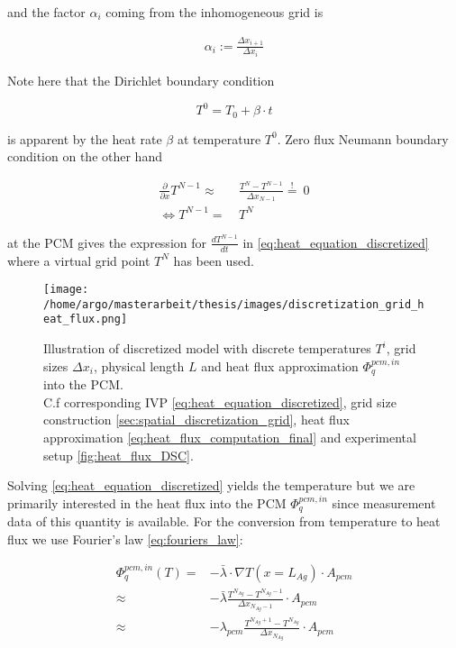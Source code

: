 \documentclass{scrartcl}[12pt, halfparskip]
\numberwithin{equation}{section}
\numberwithin{figure}{section}
\numberwithin{table}{section}
\begin{document}
and the factor $\alpha_i$ coming from the inhomogeneous grid is

\begin{align}
	\alpha_i := \frac{\Delta x_{i+1}}{\Delta x_{i}}
\end{align}


Note here that the Dirichlet boundary condition 

\begin{equation}
	T^0 = T_0 + \beta \cdot t
\end{equation}



is apparent by the heat rate $\beta$ at temperature $T^0$. Zero flux Neumann boundary condition on the other hand

\begin{align}
	\frac{\partial}{\partial x} T^{N-1} \approx & \ \frac{T^N - T^{N-1}}{\Delta x_{N-1}} \stackrel{!}{=} \ 0 \\
	\Leftrightarrow T^{N-1} = & \ T^N \nonumber 
\end{align}



 at the PCM gives the expression for $\frac{d T^{N-1}}{dt}$ in \cref{eq:heat_equation_discretized} where a virtual grid point $T^N$ has been used.

\begin{figure}[H]
	\centering
	\texttt{[image: /home/argo/masterarbeit/thesis/images/discretization\_grid\_heat\_flux.png]}
	\caption{Illustration of discretized model with discrete temperatures $T^i$, grid sizes $\Delta x_i$, physical length $L$ and heat flux approximation $\varPhi_q^{pcm,in}$ into the PCM. \\
	C.f	corresponding IVP \cref{eq:heat_equation_discretized}, grid size construction \cref{sec:spatial_discretization_grid}, heat flux approximation \cref{eq:heat_flux_computation_final} and experimental setup \cref{fig:heat_flux_DSC}.}
	\label{fig:mathematical_model_discretized}
\end{figure}


Solving \cref{eq:heat_equation_discretized} yields the temperature but we are primarily interested in the heat flux into the PCM $\varPhi_{q}^{pcm,in}$ since measurement data of this quantity is available. For the conversion from temperature to heat flux we use Fourier's law \cref{eq:fouriers_law}:

\begin{align}
	\varPhi_{q}^{pcm,in}(T) = & - \bar{\lambda} \cdot \nabla T (x=L_{Ag}) \cdot A_{pcm} \\
	\approx & - \bar{\lambda} \frac{T^{N_{Ag}} - T^{N_{Ag}-1}}{\Delta x_{N_{Ag}-1}} \cdot A_{pcm} \nonumber \\
	\approx & - \lambda_{pcm} \frac{T^{N_{Ag}+1} - T^{N_{Ag}}}{\Delta x_{N_{Ag}}} \cdot A_{pcm} \nonumber
\end{align}
\end{document}
